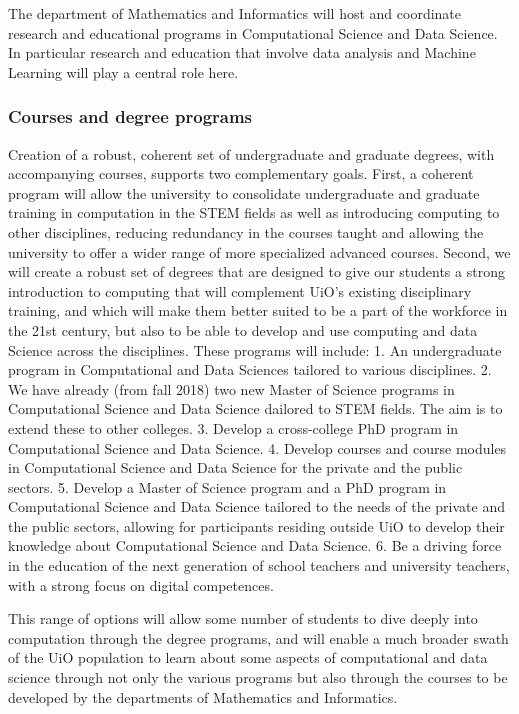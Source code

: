 \documentclass[]{article}
\begin{document}
The department of Mathematics and Informatics will host and coordinate
research and educational programs in Computational Science and Data
Science. In particular research and education that involve data analysis
and Machine Learning will play a central role here.

\hypertarget{courses-and-degree-programs}{%
\subsubsection{Courses and degree
programs}\label{courses-and-degree-programs}}

Creation of a robust, coherent set of undergraduate and graduate
degrees, with accompanying courses, supports two complementary goals.
First, a coherent program will allow the university to consolidate
undergraduate and graduate training in computation in the STEM fields as
well as introducing computing to other disciplines, reducing redundancy
in the courses taught and allowing the university to offer a wider range
of more specialized advanced courses. Second, we will create a robust
set of degrees that are designed to give our students a strong
introduction to computing that will complement UiO's existing
disciplinary training, and which will make them better suited to be a
part of the workforce in the 21st century, but also to be able to
develop and use computing and data Science across the disciplines. These
programs will include: 1. An undergraduate program in Computational and
Data Sciences tailored to various disciplines. 2. We have already (from
fall 2018) two new Master of Science programs in Computational Science
and Data Science dailored to STEM fields. The aim is to extend these to
other colleges. 3. Develop a cross-college PhD program in Computational
Science and Data Science. 4. Develop courses and course modules in
Computational Science and Data Science for the private and the public
sectors. 5. Develop a Master of Science program and a PhD program in
Computational Science and Data Science tailored to the needs of the
private and the public sectors, allowing for participants residing
outside UiO to develop their knowledge about Computational Science and
Data Science. 6. Be a driving force in the education of the next
generation of school teachers and university teachers, with a strong
focus on digital competences.

This range of options will allow some number of students to dive deeply
into computation through the degree programs, and will enable a much
broader swath of the UiO population to learn about some aspects of
computational and data science through not only the various programs but
also through the courses to be developed by the departments of
Mathematics and Informatics.
\end{document}
